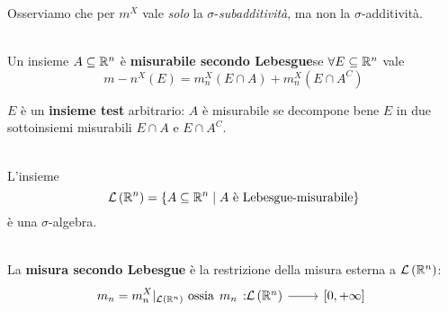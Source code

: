 	Osserviamo che per $m^X$ vale \textit{solo} la  $\sigma$-\textit{subadditività}, ma non la $\sigma$-additività.
	\begin{define}~{}\\
		Un insieme $A\subseteq\mathbb{R}^n$ è \textbf{misurabile secondo Lebesgue}se $\forall E\subseteq\mathbb{R}^n$ vale
		\begin{equation}
			m-n^X\left(E\right)=m_n^X\left(E\cap A\right)+m_n^X\left(E\cap A^C\right)
		\end{equation}
	\end{define}
	$E$ è un \textbf{insieme test} arbitrario: $A$ è misurabile se decompone bene $E$ in due sottoinsiemi misurabili $E\cap A$ e $E\cap A^C$.
	\begin{proposition}~{}\\
		L'insieme
		\begin{equation*}
			\mathcal{L}\left(\mathbb{R}^n\right)=\left\{A\subseteq \mathbb{R}^n\mid A\text{ è Lebesgue-misurabile}\right\}
		\end{equation*}
		è una $\sigma$-algebra.
	\end{proposition}
	\begin{define}~{}\\
		La \textbf{misura secondo Lebesgue} è la restrizione della misura esterna a $\mathcal{L}\left(\mathbb{R}^n\right)$:
		\begin{equation}
			m_n={m^X_n}\vert_{ \mathcal{L}\left(\realset^n\right)}\text{ ossia}\funz{m_n}{\mathcal{L}\left(\realset^n\right)}{\left[0,+\infty\right]}
		\end{equation}
	\end{define}
